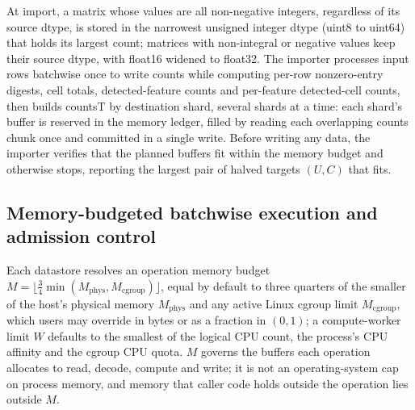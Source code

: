 \documentclass[11pt]{article}
\begin{document}
At import, a matrix whose values are all non-negative integers, regardless of its source dtype, is stored in the narrowest unsigned integer dtype (uint8 to uint64) that holds its largest count; matrices with non-integral or negative values keep their source dtype, with float16 widened to float32. The importer processes input rows batchwise once to write counts while computing per-row nonzero-entry digests, cell totals, detected-feature counts and per-feature detected-cell counts, then builds countsT by destination shard, several shards at a time: each shard's buffer is reserved in the memory ledger, filled by reading each overlapping counts chunk once and committed in a single write. Before writing any data, the importer verifies that the planned buffers fit within the memory budget and otherwise stops, reporting the largest pair of halved targets $(U,C)$ that fits.

\subsection*{Memory-budgeted batchwise execution and admission control}\label{sec:Budgeted batchwise execution}

Each datastore resolves an operation memory budget $M=\lfloor\tfrac{3}{4}\min(M_{\mathrm{phys}},M_{\mathrm{cgroup}})\rfloor$, equal by default to three quarters of the smaller of the host's physical memory $M_{\mathrm{phys}}$ and any active Linux cgroup limit $M_{\mathrm{cgroup}}$, which users may override in bytes or as a fraction in $(0,1)$; a compute-worker limit $W$ defaults to the smallest of the logical CPU count, the process's CPU affinity and the cgroup CPU quota. $M$ governs the buffers each operation allocates to read, decode, compute and write; it is not an operating-system cap on process memory, and memory that caller code holds outside the operation lies outside $M$.
\end{document}
